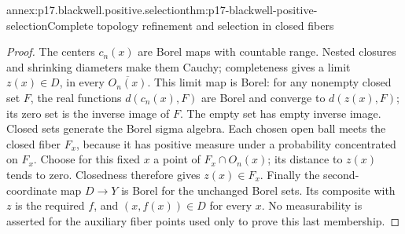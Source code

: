 \begin{annexitem}{annex:p17.blackwell.positive.selection}{thm:p17-blackwell-positive-selection}{Complete topology refinement and selection in closed fibers}
\begin{proof}
The centers \(c_n(x)\) are Borel maps with countable range.
Nested closures and shrinking diameters make them Cauchy;
completeness gives a limit \(z(x)\in D\), in every
\(\overline{O_n(x)}\). This limit map is Borel: for any nonempty
closed set \(F\), the real functions \(d(c_n(x),F)\) are Borel and
converge to \(d(z(x),F)\); its zero set is the inverse image
of \(F\). The empty set has empty inverse image.
Closed sets generate the Borel sigma algebra.
Each chosen open ball meets the closed fiber \(F_x\),
because it has positive measure under a probability concentrated
on \(F_x\). Choose for this fixed \(x\) a point of
\(F_x\cap O_n(x)\); its distance to \(z(x)\) tends to zero.
Closedness therefore gives \(z(x)\in F_x\).
Finally the second-coordinate map \(D\to Y\) is Borel for
the unchanged Borel sets. Its composite with \(z\) is the
required \(f\), and \((x,f(x))\in D\) for every \(x\).
No measurability is asserted for the auxiliary fiber points
used only to prove this last membership.
\end{proof}
\end{annexitem}

